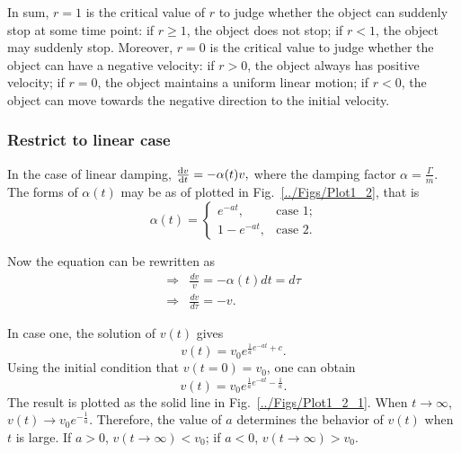  In sum, $r=1$ is the critical value of $r$ to judge whether the object can suddenly stop at some time point: if $r\geq 1$, the object does not stop; if $r<1$, the object may suddenly stop. Moreover, $r=0$ is the critical value to judge whether the object can have a negative velocity: if $r>0$, the object always has positive velocity; if $r=0$, the object maintains a uniform linear motion; if $r<0$, the object can move towards the negative direction to the initial velocity.

\subsubsection{Restrict to linear case}
In the case of linear damping,
$\frac{{\mathrm d} {v}}{{\mathrm d}t}=-\alpha(t)v,$ where the damping factor $\alpha=\frac{\Gamma}{m}$. The forms of $\alpha(t)$ may be as of plotted in Fig.~\ref{../Figs/Plot1_2}, that is
\begin{equation}
\alpha(t)= \left\{ \begin{array}{cc}
                        e^{-at},& \text{case 1;}\\
                        1-e^{-at},& \text{case 2.}
                   \end{array}\right.
\end{equation}

Now the equation can be rewritten as
\begin{align}
\Rightarrow & \frac{dv}{v}=-\alpha(t)dt=d\tau\\
\Rightarrow & \frac{dv}{d\tau}=-v.
\end{align}

In case one, the solution of $v(t)$ gives
\begin{equation}
v(t)=v_0e^{\frac{1}{a}e^{-at}+c}.
\end{equation}
Using the initial condition that $v(t=0)=v_0$, one can obtain
\begin{equation}
v(t)=v_0e^{\frac{1}{a}e^{-at}-\frac{1}{a}}.
\end{equation}
The result is plotted as the solid line in Fig.~\ref{../Figs/Plot1_2_1}. When $t\rightarrow \infty$, $v(t)\rightarrow v_0e^{-\frac{1}{a}}$. Therefore, the value of $a$ determines the behavior of $v(t)$ when $t$ is large. If $a>0$, $v(t\rightarrow \infty)<v_0$; if $a<0$, $v(t\rightarrow \infty)>v_0$.


